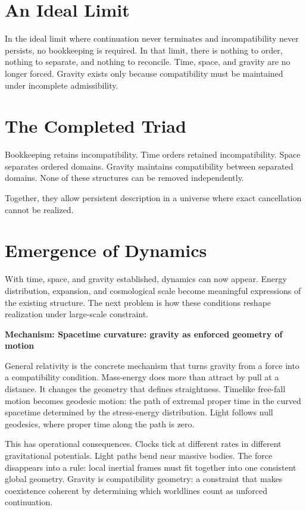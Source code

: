 \documentclass[11pt,twoside,openright]{book}
\newenvironment{mechanismbox}[1]
  {\begin{framed}\noindent\textbf{Mechanism: #1}\par\medskip}
  {\end{framed}}
\begin{document}
\section*{An Ideal Limit}

In the ideal limit where continuation never terminates and incompatibility never persists, no bookkeeping is required. In that limit, there is nothing to order, nothing to separate, and nothing to reconcile. Time, space, and gravity are no longer forced. Gravity exists only because compatibility must be maintained under incomplete admissibility.

\section*{The Completed Triad}

Bookkeeping retains incompatibility. Time orders retained incompatibility. Space separates ordered domains. Gravity maintains compatibility between separated domains. None of these structures can be removed independently.

Together, they allow persistent description in a universe where exact cancellation cannot be realized.

\section*{Emergence of Dynamics}

With time, space, and gravity established, dynamics can now appear. Energy distribution, expansion, and cosmological scale become meaningful expressions of the existing structure. The next problem is how these conditions reshape realization under large-scale constraint.

\begin{mechanismbox}{Spacetime curvature: gravity as enforced geometry of motion}

General relativity is the concrete mechanism that turns gravity from a force into a compatibility condition. Mass-energy does more than attract by pull at a distance. It changes the geometry that defines straightness. Timelike free-fall motion becomes geodesic motion: the path of extremal proper time in the curved spacetime determined by the stress-energy distribution. Light follows null geodesics, where proper time along the path is zero.

This has operational consequences. Clocks tick at different rates in different gravitational potentials. Light paths bend near massive bodies. The force disappears into a rule: local inertial frames must fit together into one consistent global geometry. Gravity is compatibility geometry: a constraint that makes coexistence coherent by determining which worldlines count as unforced continuation.

\end{mechanismbox}
\end{document}
